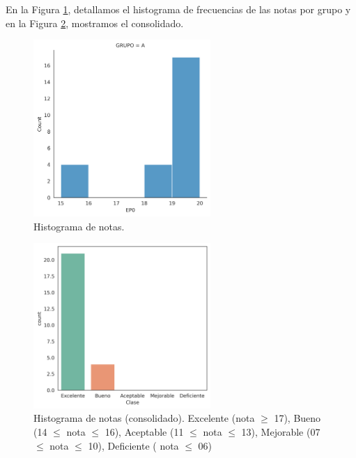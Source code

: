     \begin{flushleft}
    En la Figura \ref{fig:hist_EP0}, detallamos el histograma de frecuencias de las
    notas por grupo y en la Figura \ref{fig:hist_all_EP0}, mostramos el consolidado. 
    \end{flushleft}

    \begin{figure}[H]	
    \centering 		
				\includegraphics[width=0.6\textwidth]{../imgs/hist_EP0.png}
                \caption{Histograma de notas.}
                \label{fig:hist_EP0}
	\end{figure}

    \begin{figure}[H]	
    \centering 		
				\includegraphics[width=0.6\textwidth]{../imgs/hist_all_EP0.png}
                \caption{Histograma de notas (consolidado). Excelente (nota $\geq$ 17), Bueno (14 $\leq$ nota $\leq$ 16), Aceptable (11 $\leq$ nota $\leq$ 13), Mejorable (07 $\leq$ nota $\leq$ 10), Deficiente ( nota $\leq$ 06)}
                \label{fig:hist_all_EP0}
	\end{figure}
      

